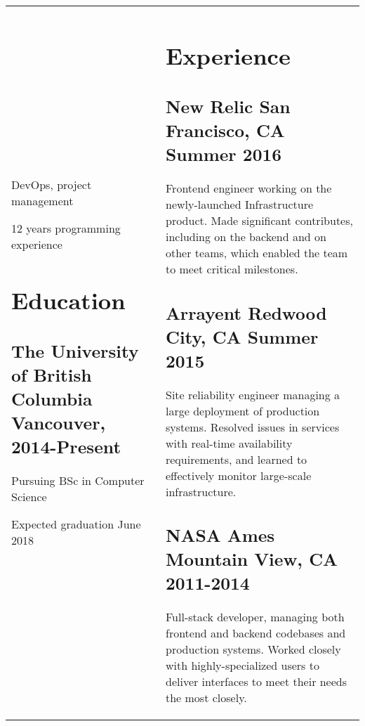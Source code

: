 \documentclass[letterpaper]{article}
\newlength{\leftcol}
\newlength{\rightcol}
\newcommand{\subtitle}{\normalfont\sffamily\color{black}\large}
\begin{document}
\begin{tabularx}{\textwidth}{@{}p{\leftcol} p{\rightcol}}
DevOps, project management

12 years programming experience


\section*{Education}

\subsection*{The University of \newline British Columbia \newline\subtitle
  Vancouver, 2014-Present}

Pursuing BSc in Computer Science

Expected graduation June 2018

&
\raggedright

\vspace*{2pt}

\section*{Experience}


\subsection*{New Relic \subtitle \hfill San Francisco, CA Summer 2016}

Frontend engineer working on the newly-launched Infrastructure product. Made
significant contributes, including on the backend and on other teams, which
enabled the team to meet critical milestones.

\subsection*{Arrayent \subtitle \hfill Redwood City, CA Summer 2015}

Site reliability engineer managing a large deployment of production systems.
Resolved issues in services with real-time availability requirements, and
learned to effectively monitor large-scale infrastructure.

\subsection*{NASA Ames \subtitle \hfill Mountain View, CA 2011-2014}

Full-stack developer, managing both frontend and backend codebases and
production systems. Worked closely with highly-specialized users to deliver
interfaces to meet their needs the most closely.


\end{tabularx}
\end{document}
